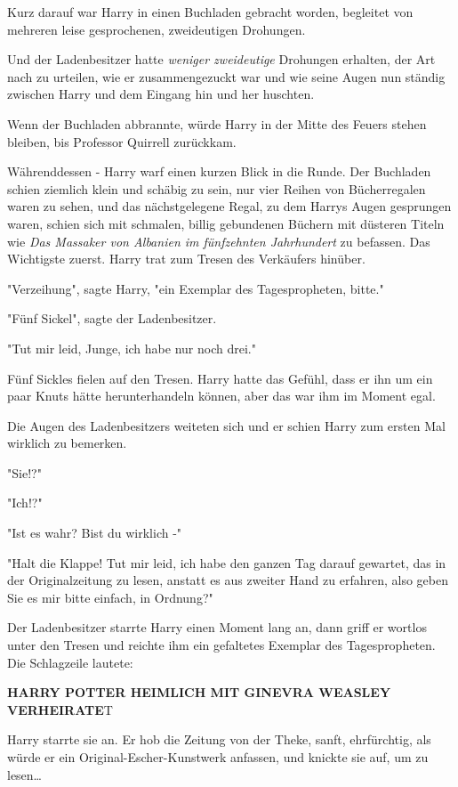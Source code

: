 {Kurz darauf war Harry in einen Buchladen gebracht worden, begleitet von mehreren leise gesprochenen, zweideutigen Drohungen.

Und der Ladenbesitzer hatte \emph{weniger zweideutige} Drohungen erhalten, der Art nach zu urteilen, wie er zusammengezuckt war und wie seine Augen nun ständig zwischen Harry und dem Eingang hin und her huschten.

Wenn der Buchladen abbrannte, würde Harry in der Mitte des Feuers stehen bleiben, bis Professor Quirrell zurückkam.

Währenddessen - Harry warf einen kurzen Blick in die Runde. Der Buchladen schien ziemlich klein und schäbig zu sein, nur vier Reihen von Bücherregalen waren zu sehen, und das nächstgelegene Regal, zu dem Harrys Augen gesprungen waren, schien sich mit schmalen, billig gebundenen Büchern mit düsteren Titeln wie \emph{Das Massaker von Albanien im fünfzehnten Jahrhundert} zu befassen. Das Wichtigste zuerst. Harry trat zum Tresen des Verkäufers hinüber.

"Verzeihung", sagte Harry, "ein Exemplar des Tagespropheten, bitte."

"Fünf Sickel", sagte der Ladenbesitzer.

"Tut mir leid, Junge, ich habe nur noch drei."

Fünf Sickles fielen auf den Tresen. Harry hatte das Gefühl, dass er ihn um ein paar Knuts hätte herunterhandeln können, aber das war ihm im Moment egal.

Die Augen des Ladenbesitzers weiteten sich und er schien Harry zum ersten Mal wirklich zu bemerken.

"Sie!?"

"Ich!?"

"Ist es wahr? Bist du wirklich -"

"Halt die Klappe! Tut mir leid, ich habe den ganzen Tag darauf gewartet, das in der Originalzeitung zu lesen, anstatt es aus zweiter Hand zu erfahren, also geben Sie es mir bitte einfach, in Ordnung?"

Der Ladenbesitzer starrte Harry einen Moment lang an, dann griff er wortlos unter den Tresen und reichte ihm ein gefaltetes Exemplar des Tagespropheten. Die Schlagzeile lautete:

\textbf{HARRY POTTER HEIMLICH MIT GINEVRA WEASLEY VERHEIRATE}T

Harry starrte sie an. Er hob die Zeitung von der Theke, sanft, ehrfürchtig, als würde er ein Original-Escher-Kunstwerk anfassen, und knickte sie auf, um zu lesen…

}
